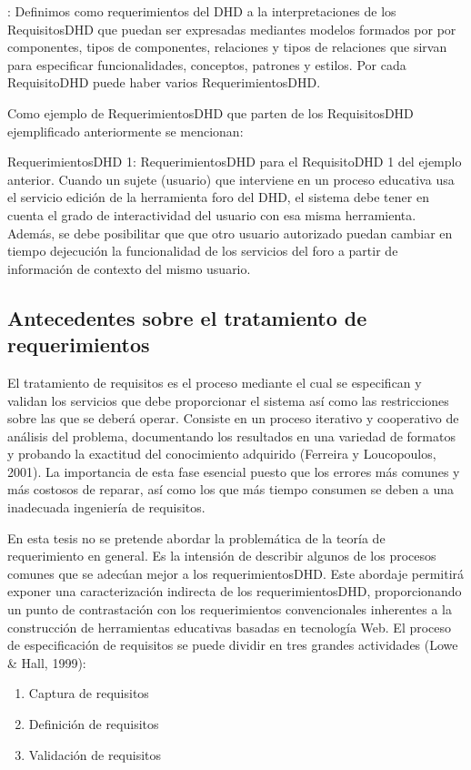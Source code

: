 \begin{defi} [Requerimiento]: Definimos como requerimientos del
DHD a la interpretaciones de los RequisitosDHD que puedan ser expresadas
mediantes modelos formados por por componentes, tipos de componentes, relaciones
y tipos de relaciones que sirvan para especificar funcionalidades, conceptos,
patrones y estilos. Por cada RequisitoDHD puede haber varios RequerimientosDHD.
\end{defi}\label{requerimiento}
 
Como ejemplo de RequerimientosDHD que parten de los RequisitosDHD
ejemplificado anteriormente se mencionan:

\begin{ejemplo}
RequerimientosDHD 1: RequerimientosDHD para el RequisitoDHD 1 del ejemplo
anterior. Cuando un sujete (usuario) que interviene en un proceso educativa usa
el servicio edición de la herramienta foro del DHD, el sistema debe tener en
cuenta el grado de interactividad del usuario con esa misma herramienta. Además,
se debe posibilitar que que otro usuario autorizado puedan cambiar en tiempo
dejecución la funcionalidad de los servicios del foro a partir de información
de contexto del mismo usuario.
\end{ejemplo}


\subsection{Antecedentes sobre el tratamiento de requerimientos}

El tratamiento de requisitos es el proceso mediante el cual se especifican
y validan los servicios que debe proporcionar el sistema así como las
restricciones sobre las que se deberá operar. Consiste en un proceso iterativo
y cooperativo de análisis del problema, documentando los resultados en
una variedad de formatos y probando la exactitud del conocimiento
adquirido (Ferreira y Loucopoulos, 2001). La importancia de esta fase
esencial puesto que los errores más comunes y más costosos de reparar, así
como los que más tiempo consumen se deben a una inadecuada ingeniería de
requisitos.

En esta tesis no se pretende abordar la problemática de la teoría de
requerimiento en general. Es la intensión de describir algunos de los
procesos comunes que se adecúan mejor a los requerimientosDHD. Este abordaje
permitirá exponer una caracterización indirecta de los requerimientosDHD,
proporcionando un punto de contrastación con los requerimientos convencionales
inherentes a la construcción de herramientas educativas basadas en tecnología
Web. El proceso de especificación de requisitos se puede dividir en tres
grandes actividades (Lowe & Hall, 1999):
\begin{enumerate}
\item Captura de requisitos
\item Definición de requisitos
\item Validación de requisitos
\end{enumerate}


